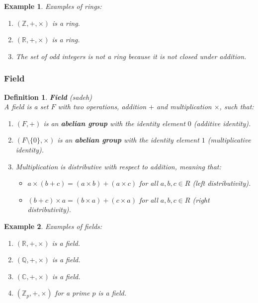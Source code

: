 \documentclass[11pt]{book} %
\newtheorem{definition}{Definition}[section]
\newtheorem*{example*}{Example}
\begin{document}
\begin{example*}
Examples of rings:
\begin{enumerate}
\item \( (\mathbb{Z}, +, \times) \) is a ring.
\item \( (\mathbb{R}, +, \times) \) is a ring.
\item The set of odd integers is not a ring because it is not closed under addition.
\end{enumerate}
\end{example*}

\subsubsection{Field}
\begin{definition}{\textbf{Field} (sadeh)} \\
    A field is a set \(F\) with two operations, addition \(+\) and multiplication \(\times\), such that:
    \begin{enumerate}
        \item \( (F, +) \) is an \textbf{abelian group} with the identity element \(0\) (additive identity).
        \item \( (F \setminus \{0\}, \times) \) is an \textbf{abelian group} with the identity element \(1\) (multiplicative identity).
        \item Multiplication is distributive with respect to addition, meaning that:
        \begin{itemize}
            \item \(a \times (b + c) = (a \times b) + (a \times c)\) for all \(a, b, c \in R\) (left distributivity).
            \item \((b + c) \times a = (b \times a) + (c \times a)\) for all \(a, b, c \in R\) (right distributivity).
        \end{itemize}
    \end{enumerate}
\end{definition}

\begin{example*}
Examples of fields:
\begin{enumerate}
\item \( (\mathbb{R}, +, \times) \) is a field.
\item \( (\mathbb{Q}, +, \times) \) is a field.
\item \( (\mathbb{C}, +, \times) \) is a field.
\item \( (\mathbb{Z}_p, +, \times) \) for a prime \(p\) is a field.
\end{enumerate}
\end{example*}
\end{document}
